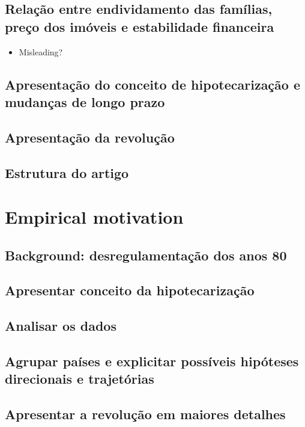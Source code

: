\documentclass{SelfArx}
\begin{document}
\subsection*{Relação entre endividamento das famílias, preço dos imóveis e estabilidade financeira}
\label{sec:org508faea}
\begin{itemize}
\item Misleading?
\end{itemize}
\subsection*{Apresentação do conceito de hipotecarização e mudanças de longo prazo}
\label{sec:org31b7fe9}
\subsection*{Apresentação da revolução}
\label{sec:org8790cf9}
\subsection*{Estrutura do artigo}
\label{sec:orga0fff0c}

\section*{Empirical motivation}
\label{sec:org45fb646}
\subsection*{Background: desregulamentação dos anos 80}
\label{sec:org5e483de}
\subsection*{Apresentar conceito da hipotecarização}
\label{sec:org4ece29e}
\subsection*{Analisar os dados}
\label{sec:org5e6f22c}
\subsection*{Agrupar países e explicitar possíveis hipóteses direcionais e trajetórias}
\label{sec:org393888c}
\subsection*{Apresentar a revolução em maiores detalhes}
\label{sec:orgdd22a94}
\end{document}

